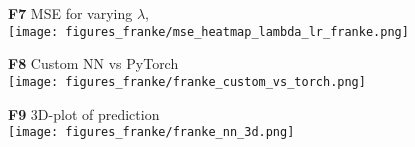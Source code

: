 \documentclass{article}
\begin{document}
\begin{figure}[htbp]
{\begin{minipage}{\textwidth}
\begin{minipage}{0.325\textwidth}
            \centering
            \textbf{F7} MSE for varying $\lambda$, \eta\label{fig:F7} \\  %
            \texttt{[image: figures\_franke/mse\_heatmap\_lambda\_lr\_franke.png]}
        \end{minipage}
        \begin{minipage}{0.325\textwidth}
            \centering
            \textbf{F8} Custom NN vs PyTorch\label{fig:F8} \\  
            \texttt{[image: figures\_franke/franke\_custom\_vs\_torch.png]}
        \end{minipage}
            \begin{minipage}{0.325\textwidth}
            \centering
            \textbf{F9} 3D-plot of prediction\label{fig:F9} \\  %
            \texttt{[image: figures\_franke/franke\_nn\_3d.png]}
        \end{minipage}
    

\end{minipage}}
\end{figure}
\end{document}

